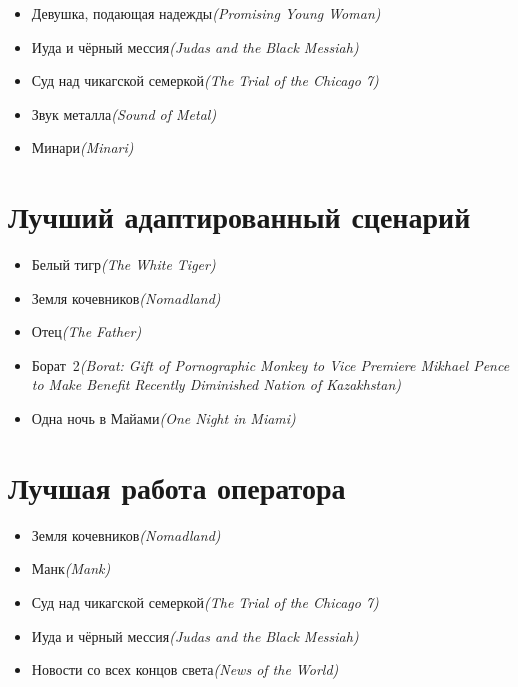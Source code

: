 \documentclass[a4paper,10pt]{article}
\begin{document}
\begin{multicols}{2}
\begin{itemize}
	\item Девушка, подающая надежды\newline\textit{(Promising Young Woman)}
	\item Иуда и чёрный мессия\newline\textit{(Judas and the Black Messiah)}
	\item Суд над чикагской семеркой\newline\textit{(The Trial of the Chicago 7)}
	\item Звук металла\newline\textit{(Sound of Metal)}
	\item Минари\newline\textit{(Minari)}
\end{itemize}

\section{Лучший адаптированный сценарий}

\begin{itemize}
	\item Белый тигр\newline\textit{(The White Tiger)}
	\item Земля кочевников\newline\textit{(Nomadland)}
	\item Отец\newline\textit{(The Father)}
	\item Борат 2\newline\textit{(Borat: Gift of Pornographic Monkey to Vice Premiere Mikhael Pence to Make Benefit Recently Diminished Nation of Kazakhstan)}
	\item Одна ночь в Майами\newline\textit{(One Night in Miami)}
\end{itemize}

\section{Лучшая работа оператора}

\begin{itemize}
	\item Земля кочевников\newline\textit{(Nomadland)}
	\item Манк\newline\textit{(Mank)}
	\item Суд над чикагской семеркой\newline\textit{(The Trial of the Chicago 7)}
	\item Иуда и чёрный мессия\newline\textit{(Judas and the Black Messiah)}
	\item Новости со всех концов света\newline\textit{(News of the World)}
\end{itemize}


\end{multicols}
\end{document}
